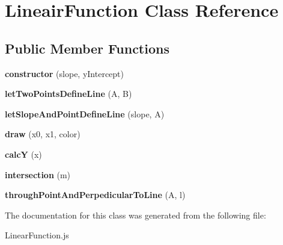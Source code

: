 \hypertarget{class_lineair_function}{}\section{Lineair\+Function Class Reference}
\label{class_lineair_function}
\subsection*{Public Member Functions}
\begin{DoxyCompactItemize}
\item 
\mbox{\label{class_lineair_function_a11382b5fc6d59cbb10efb18973bdefa4}} 
{\bfseries constructor} (slope, y\+Intercept)
\item 
\mbox{\label{class_lineair_function_a341037d0b4e9cdc29b59d58f7d36f9cc}} 
{\bfseries let\+Two\+Points\+Define\+Line} (A, B)
\item 
\mbox{\label{class_lineair_function_a041e859eb60f50e2b4577c3a780f8d50}} 
{\bfseries let\+Slope\+And\+Point\+Define\+Line} (slope, A)
\item 
\mbox{\label{class_lineair_function_ac128f3f23c2496685a6b7dff2aee48e5}} 
{\bfseries draw} (x0, x1, color)
\item 
\mbox{\label{class_lineair_function_aa4e20aeaba2f610ef0ba4a9fe45f2a0a}} 
{\bfseries calcY} (x)
\item 
\mbox{\label{class_lineair_function_a73427a52e288f0c5b91a6792e95df547}} 
{\bfseries intersection} (m)
\item 
\mbox{\label{class_lineair_function_a307c8d5a4d4f4f340d111f84a93b25e9}} 
{\bfseries through\+Point\+And\+Perpedicular\+To\+Line} (A, l)
\end{DoxyCompactItemize}


The documentation for this class was generated from the following file\+:\begin{DoxyCompactItemize}
\item 
Linear\+Function.\+js\end{DoxyCompactItemize}
